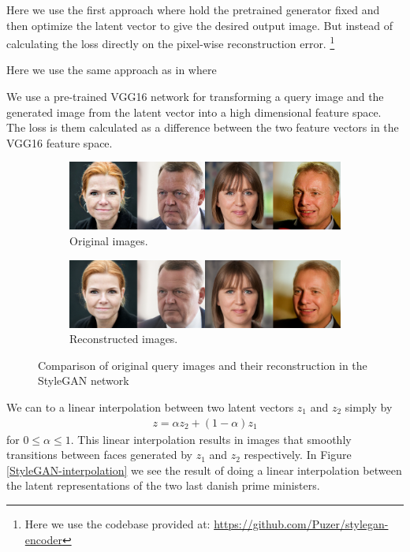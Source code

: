 Here we use the first approach where hold the pretrained generator fixed and then optimize the latent vector to give the desired output image. But instead of calculating the loss directly on the pixel-wise reconstruction error. \footnote{Here we use the codebase provided at: \url{https://github.com/Puzer/stylegan-encoder}}

Here we use the same approach as in \cite{styletransfer} where

We use a pre-trained VGG16 network for transforming a query image and the generated image from the latent vector into a high dimensional feature space. The loss is them calculated as a difference between the two feature vectors in the VGG16 feature space.

\begin{figure}
    \centering
    \begin{subfigure}[b]{\textwidth}
        \includegraphics[width=\textwidth]{fig/stylegan/originals}
        \caption{Original images.}
    \end{subfigure}
    \begin{subfigure}[b]{\textwidth}
        \includegraphics[width=\textwidth]{fig/stylegan/reconstructions}
        \caption{Reconstructed images.}
    \end{subfigure}
    \caption{Comparison of original query images and their reconstruction in the StyleGAN network}
    \label{stylegan-reconstruction}
\end{figure}

We can to a linear interpolation between two latent vectors $z_1$ and $z_2$ simply by
\begin{align}
  z = \alpha z_2 + (1-\alpha)z_1
\end{align}
for $0 \leq \alpha \leq 1$. This linear interpolation results in images that smoothly transitions between faces generated by $z_1$ and $z_2$ respectively. In Figure \ref{StyleGAN-interpolation} we see the result of doing a linear interpolation between the latent representations of the two last danish prime ministers.


